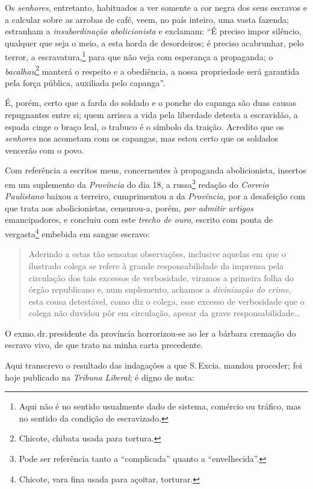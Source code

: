 {Os \emph{senhores}, entretanto, habituados a ver somente a cor negra dos
seus escravos e a calcular sobre as arrobas de café, veem, no país
inteiro, uma vasta fazenda; estranham a \emph{insubordinação
abolicionista} e exclamam: ``É preciso impor silêncio, qualquer que seja
o meio, a esta horda de desordeiros; é preciso acabrunhar, pelo terror,
a escravatura,\footnote{Aqui não é no sentido usualmente dado de
  sistema, comércio ou tráfico, mas no sentido da condição de
  escravizado.} para que não veja com esperança a propaganda; o
\emph{bacalhau}\footnote{Chicote, chibata usada para tortura.} manterá
o respeito e a obediência, a nossa propriedade será garantida pela força
pública, auxiliada pelo capanga''.

É, porém, certo que a farda do soldado e o ponche do capanga são duas
causas repugnantes entre si; quem arrisca a vida pela liberdade detesta
a escravidão, a espada cinge o braço leal, o trabuco é o símbolo da
traição. Acredito que os \emph{senhores} nos acometam com os capangas,
mas estou certo que os soldados vencerão com o povo.

Com referência a escritos meus, concernentes à propaganda abolicionista,
insertos em um suplemento da \emph{Província} do dia 18, a
russa\footnote{Pode ser referência tanto a ``complicada'' quanto a
  ``envelhecida''.} redação do \emph{Correio Paulistano} baixou a terreiro,
cumprimentou a da \emph{Província}, por a desafeição com que trata aos
abolicionistas, censurou-a, porém, \emph{por admitir artigos}
emancipadores, e concluiu com este \emph{trecho de ouro}, escrito com
ponta de vergasta\footnote{Chicote, vara fina usada para açoitar,
  torturar.} embebida em sangue escravo:

\begin{quote}
Aderindo a estas tão sensatas observações, inclusive aquelas em que o
ilustrado colega se refere à grande responsabilidade da imprensa pela
circulação dos tais excessos de verbosidade, viramos a primeira folha do
órgão republicano e, num suplemento, achamos a \emph{divinização do
crime}, esta cousa detestável, como diz o colega, esse excesso de
verbosidade que o colega não duvidou pôr em circulação, apesar da grave
responsabilidade\ldots{}
\end{quote}

O exmo.\,dr.\,presidente da província horrorizou-se ao ler a bárbara
cremação do escravo vivo, de que trato na minha carta precedente.

Aqui transcrevo o resultado das indagações a que S.\,Excia. mandou
proceder; foi hoje publicado na \emph{Tribuna} \emph{Liberal}; é digno
de nota:

}
